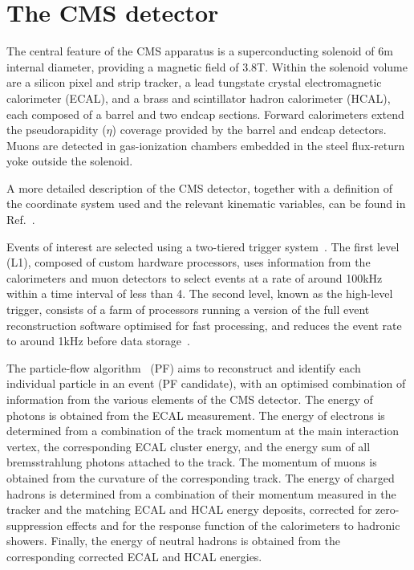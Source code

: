 \documentclass[11pt,twoside,a4paper,cmspaper,final,collab]{cms-tdr}
\begin{document}
\section{The CMS detector}
\label{sec:detector}
The central feature of the CMS apparatus is a superconducting solenoid of 6\unit{m} internal diameter, providing a magnetic field of 3.8\unit{T}. Within the solenoid volume are a silicon pixel and strip tracker, a lead tungstate crystal electromagnetic calorimeter (ECAL), and a brass and scintillator hadron calorimeter (HCAL), each composed of a barrel and two endcap sections. Forward calorimeters extend the pseudorapidity ($\eta$) coverage provided by the barrel and endcap detectors. Muons are detected in gas-ionization chambers embedded in the steel flux-return yoke outside the solenoid.

A more detailed description of the CMS detector, 
together with a definition of the coordinate system used and the relevant kinematic variables, 
can be found in Ref.~\cite{CMSdetector}.

Events of interest are selected using a two-tiered trigger system~\cite{Khachatryan:2016bia}. 
The first level (L1), composed of custom hardware processors, 
uses information from the calorimeters and muon detectors to select events 
at a rate of around 100\unit{kHz} within a time interval of less than 4\mus. 
The second level, known as the high-level trigger, 
consists of a farm of processors running a version of the full event reconstruction software 
optimised for fast processing, and reduces the event rate to around 1\unit{kHz} before data storage~\cite{CMS_HLT}.

The particle-flow algorithm~\cite{ParticleFlow} (PF) aims to reconstruct 
and identify each individual particle in an event (PF candidate), 
with an optimised combination of information from the various elements of the CMS detector. 
The energy of photons is obtained from the ECAL measurement.
The energy of electrons is determined from a combination of the track momentum at the main interaction vertex, the corresponding ECAL cluster energy, and the energy sum of all bremsstrahlung photons attached to the track.
The momentum of muons is obtained from the curvature of the corresponding track. 
The energy of charged hadrons is determined from a combination of their momentum 
measured in the tracker and the matching ECAL and HCAL energy deposits, 
corrected for zero-suppression effects 
and for the response function of the calorimeters to hadronic showers. 
Finally, the energy of neutral hadrons is obtained 
from the corresponding corrected ECAL and HCAL energies.
\end{document}

